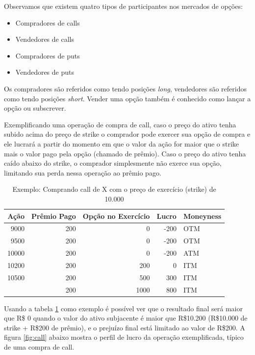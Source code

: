 \documentclass[]{book}
\providecommand{\tightlist}{%
  \setlength{\itemsep}{0pt}\setlength{\parskip}{0pt}}
\begin{document}
Observamos que existem quatro tipos de participantes nos mercados de
opções:

\begin{itemize}
\tightlist
\item
  Compradores de calls
\item
  Vendedores de calls
\item
  Compradores de puts
\item
  Vendedores de puts
\end{itemize}

Os compradores são referidos como tendo posições \emph{long}, vendedores
são referidos como tendo posições \emph{short}. Vender uma opção também
é conhecido como lançar a opção ou subscrever.

Exemplificando uma operação de compra de call, caso o preço do ativo
tenha subido acima do preço de strike o comprador pode exercer sua opção
de compra e ele lucrará a partir do momento em que o valor da ação for
maior que o strike mais o valor pago pela opção (chamado de prêmio).
Caso o preço do ativo tenha caído abaixo do strike, o comprador
simplesmente não exerce sua opção, limitando sua perda nessa operação ao
prêmio pago.

\begin{table}[t]

\caption{\label{tab:opcao}Exemplo: Comprando call de X com o preço de exercício (strike) de 10.000}
\centering
\begin{tabular}{rrrrl}
\toprule
Ação & Prêmio Pago & Opção no Exercício & Lucro & Moneyness\\
\midrule
9000 & 200 & 0 & -200 & OTM\\
9500 & 200 & 0 & -200 & OTM\\
10000 & 200 & 0 & -200 & ATM\\
10200 & 200 & 200 & 0 & ITM\\
10500 & 200 & 500 & 300 & ITM\\
\addlinespace
11000 & 200 & 1000 & 800 & ITM\\
\bottomrule
\end{tabular}
\end{table}

Usando a tabela \ref{tab:opcao} como exemplo é possível ver que o
resultado final será maior que R\$ 0 quando o valor do ativo subjacente
é maior que R\$10.200 (R\$10.000 de strike + R\$200 de prêmio), e o
prejuízo final está limitado ao valor de R\$200. A figura \ref{fig:call}
abaixo mostra o perfil de lucro da operação exemplificada, típico de uma
compra de call.
\end{document}
